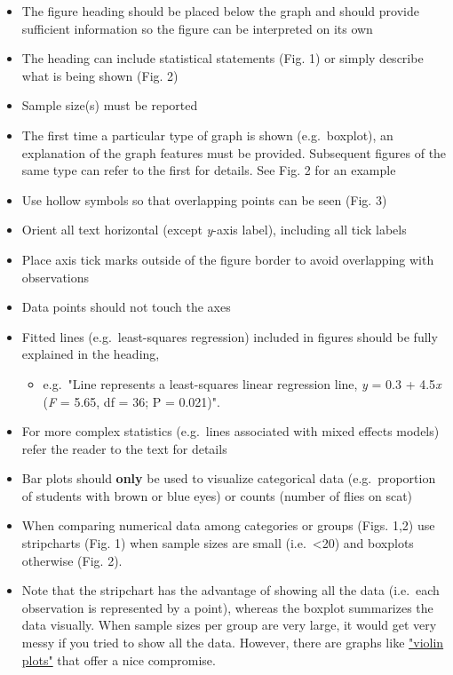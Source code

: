 \documentclass[
]{book}
\providecommand{\tightlist}{%
  \setlength{\itemsep}{0pt}\setlength{\parskip}{0pt}}
\begin{document}
\begin{itemize}
\tightlist
\item
  The figure heading should be placed below the graph and should provide sufficient information so the figure can be interpreted on its own
\item
  The heading can include statistical statements (Fig. 1) or simply describe what is being shown (Fig. 2)
\item
  Sample size(s) must be reported
\item
  The first time a particular type of graph is shown (e.g.~boxplot), an explanation of the graph features must be provided. Subsequent figures of the same type can refer to the first for details. See Fig. 2 for an example
\item
  Use hollow symbols so that overlapping points can be seen (Fig. 3)
\item
  Orient all text horizontal (except \emph{y}-axis label), including all tick labels
\item
  Place axis tick marks outside of the figure border to avoid overlapping with observations
\item
  Data points should not touch the axes
\item
  Fitted lines (e.g.~least-squares regression) included in figures should be fully explained in the heading,

  \begin{itemize}
  \tightlist
  \item
    e.g.~"Line represents a least-squares linear regression line, \emph{y} = 0.3 + 4.5\emph{x} (\emph{F} = 5.65, df = 36; P = 0.021)".
  \end{itemize}
\item
  For more complex statistics (e.g.~lines associated with mixed effects models) refer the reader to the text for details
\item
  Bar plots should \textbf{only} be used to visualize categorical data (e.g.~proportion of students with brown or blue eyes) or counts (number of flies on scat)
\item
  When comparing numerical data among categories or groups (Figs. 1,2) use stripcharts (Fig. 1) when sample sizes are small (i.e.~\textless20) and boxplots otherwise (Fig. 2).
\item
  Note that the stripchart has the advantage of showing all the data (i.e.~each observation is represented by a point), whereas the boxplot summarizes the data visually. When sample sizes per group are very large, it would get very messy if you tried to show all the data. However, there are graphs like \href{https://www.r-graph-gallery.com/violin.html}{"violin plots"} that offer a nice compromise.
\end{itemize}
\end{document}
